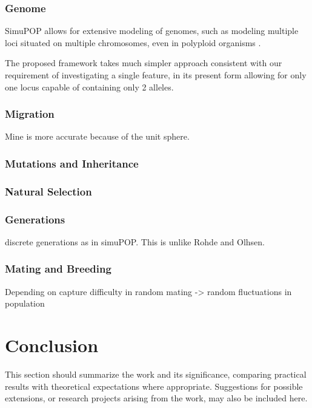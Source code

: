 \documentclass{l4proj}
\begin{document}
\subsection{Genome}
SimuPOP allows for extensive modeling of genomes, such as modeling multiple loci situated on multiple \gls{chromosome}s, even in \gls{polyploid} organisms \parencite{simuPOP16}.

The proposed framework takes much simpler approach consistent with our requirement of investigating a single feature, in its present form allowing for only one \gls{locus} capable of containing only 2 alleles.

\subsection{Migration}
Mine is more accurate because of the unit sphere.

\subsection{Mutations and Inheritance}

\subsection{Natural Selection}

\subsection{Generations}
discrete generations as in simuPOP. This is unlike Rohde and Olhsen.

\subsection{Mating and Breeding}
Depending on 
capture difficulty in random mating -> random fluctuations in population 

\chapter{Conclusion}\label{conclusion}
This section should summarize the work and its significance, comparing practical results with theoretical expectations where appropriate. Suggestions for possible extensions, or research projects arising from the work, may also be included here.

\printglossaries
\printbibliography[heading=bibintoc]
\end{document}
